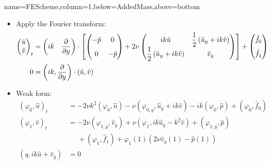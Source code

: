 \documentclass[
paperwidth=48in,paperheight=36in,
fontscale=0.4
]{baposter}
\begin{document}
\begin{poster}
{name=FEScheme,column=1,below=AddedMass,above=bottom}
{
\begin{itemize}
    \item Apply the Fourier transform:
          \begin{align*}
              \begin{pmatrix}
                  \hat{u} \\ \hat{v}
              \end{pmatrix}_t
              &=
              \begin{pmatrix}
                  i k & \dfrac{\partial}{\partial y}
              \end{pmatrix}
              \cdot
              \left[
              \begin{pmatrix}
                  -\hat{p} \vphantom{\dfrac{1}{2}} & 0                        \\
                  0 \vphantom{\dfrac{1}{2}}        & -\hat{p}
              \end{pmatrix}
              +
              2 \nu
              \begin{pmatrix}
                  i k \hat{u} & \dfrac{1}{2} \left(\hat{u}_y + i k \hat{v}\right)\\
                  \dfrac{1}{2} \left(\hat{u}_y + i k \hat{v}\right) & \hat{v}_y
              \end{pmatrix}
              \right]
              +
              \begin{pmatrix}
                  \hat{f}_0 \vphantom{\dfrac{1}{2}}                           \\
                  \hat{f}_1 \vphantom{\dfrac{1}{2}}
              \end{pmatrix}                                                   \\
              0 &=
              \left(i k, \dfrac{\partial}{\partial y}\right) \cdot (\hat{u},
              \hat{v})
          \end{align*}

    \item Weak form:
          \begin{align*}
              (\varphi_0, \hat{u})_t
              &=
              -2 \nu k^2 (\varphi_0, \hat{u})
              - \nu (\varphi_{0,y}, \hat{u}_y + i k \hat{v})
              - i k (\varphi_0, \hat{p})
              + (\varphi_0, \hat{f}_0)                                        \\
              (\varphi_1, \hat{v})_t
              &=
              -2 \nu (\varphi_{1,y}, \hat{v}_y)
              + \nu (\varphi_1, i k \hat{u}_y - k^2 \hat{v})
              + (\varphi_{1,y}, \hat{p})                                      \\
              &\phantom{=} + (\varphi_1, \hat{f}_1)
              + \varphi_1(1) (2 \nu \hat{v}_y(1) - \hat{p}(1))
              \nonumber                                                       \\
              (q, i k \hat{u} + \hat{v}_y)
              &= 0
          \end{align*}


\end{itemize}}
\end{poster}
\end{document}
